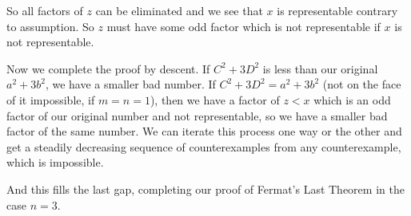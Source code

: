 \documentclass[12pt]{article}
\begin{document}
So all factors of $z$ can be eliminated and we see that $x$ is representable contrary to assumption.  So $z$ must have some odd factor
which is not representable if $x$ is not representable.

Now we complete the proof by descent.  If $C^2+3D^2$ is less than our original $a^2+3b^2$, we have a smaller bad number.
If $C^2+3D^2= a^2+3b^2$ (not on the face of it impossible, if $m=n=1$), then we have a factor of $z<x$ which is an odd factor of our original number and not representable, so we have a smaller bad factor of the same number.   We can iterate this process one way or the other and get a steadily decreasing sequence of counterexamples from any counterexample, which is impossible.

And this fills the last gap, completing our proof of Fermat's Last Theorem in the case $n=3$.
\end{document}
